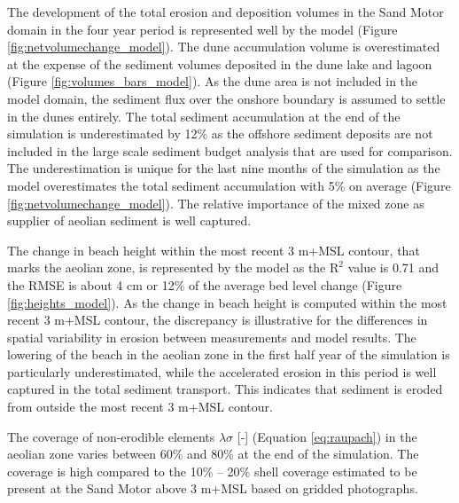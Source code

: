 The development of the total erosion and deposition volumes in the
Sand Motor domain in the four year period is represented well by the
model (Figure \ref{fig:netvolumechange_model}). The dune accumulation
volume is overestimated at the expense of the sediment volumes
deposited in the dune lake and lagoon (Figure
\ref{fig:volumes_bars_model}). As the dune area is not included in the
model domain, the sediment flux over the onshore boundary is assumed
to settle in the dunes entirely. The total sediment accumulation at
the end of the simulation is underestimated by 12\% as the offshore
sediment deposits are not included in the large scale sediment budget
analysis that are used for comparison. The underestimation is unique
for the last nine months of the simulation as the model overestimates
the total sediment accumulation with 5\% on average (Figure
\ref{fig:netvolumechange_model}). The relative importance of the mixed
zone as supplier of aeolian sediment is well captured.

The change in beach height within the most recent 3 m+MSL contour,
that marks the aeolian zone, is represented by the model as the
$\mathrm{R^2}$ value is 0.71 and the RMSE is about 4 cm or 12\% of the
average bed level change (Figure \ref{fig:heights_model}). As the
change in beach height is computed within the most recent 3 m+MSL
contour, the discrepancy is illustrative for the differences in
spatial variability in erosion between measurements and model
results. The lowering of the beach in the aeolian zone in the first
half year of the simulation is particularly underestimated, while the
accelerated erosion in this period is well captured in the total
sediment transport. This indicates that sediment is eroded from
outside the most recent 3 m+MSL contour.

The coverage of non-erodible elements $\lambda \sigma$ [-] (Equation
\ref{eq:raupach}) in the aeolian zone varies between 60\% and 80\% at
the end of the simulation. The coverage is high compared to the 10\%
-- 20\% shell coverage estimated to be present at the Sand Motor above
3 m+MSL based on gridded photographs.


